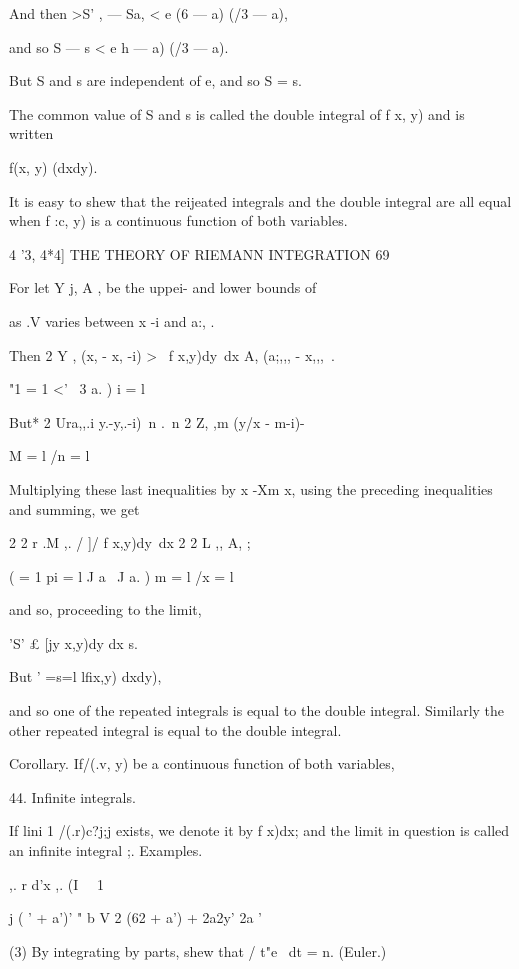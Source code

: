 And then >S' ,   — Sa,   < e (6 — a) (/3 — a), 

and so S — s < e h — a) (/3 — a). 

But S and s are independent of e, and so S = s. 

The common value of S and s is called the double integral of f x, y) and 
is written 

f(x, y) (dxdy). 



It is easy to shew that the reijeated integrals and the double integral are all equal 
when f :c, y) is a continuous function of both variables. 



4 '3, 4*4] THE THEORY OF RIEMANN INTEGRATION 69 

For let Y j, A , be the uppei- and lower bounds of 

as .V varies between x -i and a:, . 

Then 2 Y , (x,  - x, -i) > \ f  x,y)dy\ dx  A,  (a;,,, - x,,,\  . 

"1 = 1   <' \ 3 a. )  i = l 

But* 2 Ura,,.i y.-y,.-i) \,n .\ n  2 Z, ,m (y/x - m-i)- 

M = l /n = l 

Multiplying these last inequalities by x -Xm x, using the preceding inequalities and 
summing, we get 

2 2 r .M  ,. / ]/ f x,y)dy\ dx 2 2 L ,, A,  ; 

 ( = 1 pi = l J a \ J a. ) m = l /x = l 

and so, proceeding to the limit, 

'S' £ [jy x,y)dy dx s. 

But ' =s=l lfix,y) dxdy), 

and so one of the repeated integrals is equal to the double integral. Similarly the other 
repeated integral is equal to the double integral. 

Corollary. If/(.v, y) be a continuous function of both variables, 

44. Infinite integrals. 

If lini   1 /(.r)c?j;j exists, we denote it by f x)dx; and the limit in 
question is called an infinite integral ;. 
Examples. 

 ,. r d'x ,. (I \ \  1 

  j ( ' + a')' " b   V 2 (62 + a') + 2a2y' 2a  ' 

(3) By integrating by parts, shew that / t"e~ dt = n.  (Euler.) 

